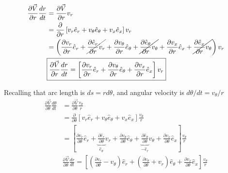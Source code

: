 \documentclass[12pt]{article}
\begin{document}
\begin{align*}
\frac{\partial \vec{V}}{ \partial r}\frac{dr}{dt} 
&= \frac{\partial \vec{V}}{ \partial r}v_r\\ 
&= \frac{\partial}{\partial r}
\left[
v_r 	   \hat{e}_r +
v_{\theta} \hat{e}_{\theta} +
v_x		   \hat{e}_x
\right]  v_r \\ 
&=
\left(
\frac{\partial v_r}{\partial r} 		\hat{e}_r +
\cancel{\frac{\partial  \hat{e}_r}{\partial r} 		v_r}       +
\frac{\partial v_{\theta}}{\partial r}		\hat{e}_{\theta} +
\cancel{\frac{\partial \hat{e}_{\theta}}{\partial r} v_{\theta}}  +
\frac{\partial v_x}{\partial r}\hat{e}_{x} +
\cancel{\frac{\partial \hat{e}_{x}}{\partial r} v_{\theta}} \right) v_r\\ 
&\boxed{ 
	\frac{\partial \vec{V}}{ \partial r}\frac{dr}{dt}     = \left[
	\frac{\partial 		  v_r}{\partial r} 		\hat{e}_r +
	\frac{\partial v_{\theta}}{\partial r}		\hat{e}_{\theta} +
	\frac{\partial v_x}{\partial r}\hat{e}_{x}\right] v_r} \\
\end{align*}

Recalling that arc length is $ds = rd\theta$, and angular velocity is $d\theta/dt = v_{\theta}/r$
\begin{align*}
\frac{\partial \vec{V}}{ \partial \theta}\frac{d\theta}{dt} 
&= \frac{\partial \vec{V}}{ \partial \theta}\frac{v_{\theta}}{r}\\
&= \frac{\partial}{\partial \theta}
\left[
v_r 	   \hat{e}_r +
v_{\theta} \hat{e}_{\theta} +
v_x		   \hat{e}_x
\right]  \frac{v_{\theta}}{r} \\
& =
\left[
\frac{\partial v_r}{\partial \theta} 		\hat{e}_r +
\underbrace{\frac{\partial  \hat{e}_r}{\partial \theta}}_{\hat{e}_{\theta}} 		v_r       +
\frac{\partial v_{\theta}}{\partial \theta}		\hat{e}_{\theta} +
\underbrace{\frac{\partial \hat{e}_{\theta}}{\partial \theta}}_{-\hat{e}_{r}}  v_{\theta}  +
\frac{\partial v_x}{\partial \theta}\hat{e}_{x} 
\right] \frac{v_{\theta}}{r} \\ 
&\boxed{ 
	\frac{\partial \vec{V}}{ \partial  \theta}\frac{dr}{dt}     = 
	\left[\left(\frac{\partial 		  v_r}{\partial \theta} - v_{\theta} \right)		\hat{e}_r +
	\left(\frac{\partial   v_{\theta}}{\partial \theta}	+ v_r	     \right)\hat{e}_{\theta} +
	\frac{\partial v_x}{\partial \theta}\hat{e}_{x}
	\right] \frac{v_{\theta}}{r}} \\
\end{align*}
\end{document}
